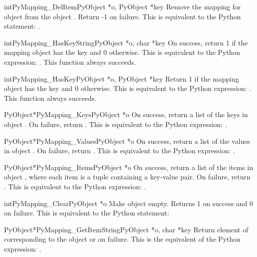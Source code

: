 \documentclass[twoside,openright]{report}
\begin{document}
\begin{cfuncdesc}{int}{PyMapping_DelItem}{PyObject *o, PyObject *key}
Remove the mapping for object  from the object .
Return -1 on failure.  This is equivalent to
the Python statement: .
\end{cfuncdesc}


\begin{cfuncdesc}{int}{PyMapping_HasKeyString}{PyObject *o, char *key}
On success, return 1 if the mapping object has the key 
and 0 otherwise.  This is equivalent to the Python expression:
. 
This function always succeeds.
\end{cfuncdesc}


\begin{cfuncdesc}{int}{PyMapping_HasKey}{PyObject *o, PyObject *key}
Return 1 if the mapping object has the key 
and 0 otherwise.  This is equivalent to the Python expression:
. 
This function always succeeds.
\end{cfuncdesc}


\begin{cfuncdesc}{PyObject*}{PyMapping_Keys}{PyObject *o}
On success, return a list of the keys in object .  On
failure, return \NULL{}. This is equivalent to the Python
expression: .
\end{cfuncdesc}


\begin{cfuncdesc}{PyObject*}{PyMapping_Values}{PyObject *o}
On success, return a list of the values in object .  On
failure, return \NULL{}. This is equivalent to the Python
expression: .
\end{cfuncdesc}


\begin{cfuncdesc}{PyObject*}{PyMapping_Items}{PyObject *o}
On success, return a list of the items in object , where
each item is a tuple containing a key-value pair.  On
failure, return \NULL{}. This is equivalent to the Python
expression: .
\end{cfuncdesc}

\begin{cfuncdesc}{int}{PyMapping_Clear}{PyObject *o}
Make object  empty.  Returns 1 on success and 0 on failure.
This is equivalent to the Python statement:
\end{cfuncdesc}


\begin{cfuncdesc}{PyObject*}{PyMapping_GetItemString}{PyObject *o, char *key}
Return element of  corresponding to the object  or \NULL{}
on failure. This is the equivalent of the Python expression:
.
\end{cfuncdesc}
\end{document}
